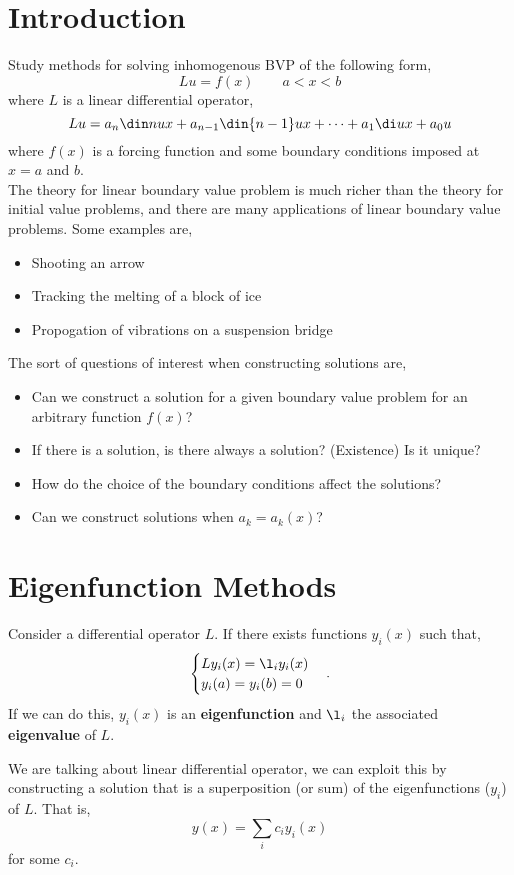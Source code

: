 

\section{Introduction}
Study methods for solving inhomogenous BVP of the following form,
$$ Lu = f(x) \qquad a < x < b $$
where $L$ is a linear differential operator,
$$ Lu = a_n \din n u x + a_{n-1}\din {n-1} u x + \dots + a_1 \di u x + a_0 u  $$
where $f(x)$ is a forcing function and some boundary conditions imposed at $x = a$ and $b$. \\

\noindent
The theory for linear boundary value problem is much richer than the theory for initial value problems, and there are many applications of linear boundary value problems. Some examples are,
\begin{itemize}
  \item Shooting an arrow
  \item Tracking the melting of a block of ice
  \item Propogation of vibrations on a suspension bridge
\end{itemize}

\noindent
The sort of questions of interest when constructing solutions are,
\begin{itemize}
  \item Can we construct a solution for a given boundary value problem for an arbitrary function $f(x)$?
  \item If there is a solution, is there always a solution? (Existence) Is it unique?
  \item How do the choice of the boundary conditions affect the solutions?
  \item Can we construct solutions when $a_k = a_k(x)$?
\end{itemize}


\section{Eigenfunction Methods}
Consider a differential operator $L$. If there exists functions $y_i(x)$ such that,
$$ \begin{cases}
  Ly_i(x) = \l_i y_i(x) \\
  y_i(a) = y_i(b) = 0
\end{cases}. $$
If we can do this, $y_i(x)$ is an \textbf{eigenfunction} and $\l_i$ the associated \textbf{eigenvalue} of $L$.
\begin{idea}
  We are talking about linear differential operator, we can exploit this by constructing a solution that is a superposition (or sum) of the eigenfunctions ($y_i$) of $L$. That is,
  $$ y(x) = \sum_i c_iy_i(x) $$
  for some $c_i$.
\end{idea}

